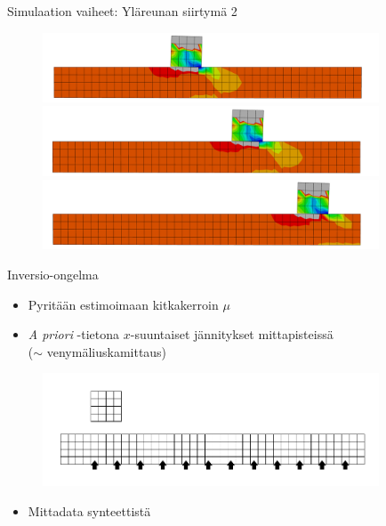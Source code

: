 \documentclass{beamer}
\begin{document}
\begin{frame}{Simulaation vaiheet: Yläreunan siirtymä 2}

\begin{figure}
\includegraphics[width=10cm]{anim3.pdf}\\
\includegraphics[width=10cm]{anim4.pdf}\\
\includegraphics[width=10cm]{anim5.pdf}
\end{figure}

\end{frame}

\begin{frame}{Inversio-ongelma}

\begin{itemize}
\item Pyritään estimoimaan kitkakerroin $\mu$
\item \emph{A priori} -tietona $x$-suuntaiset jännitykset mittapisteissä\\($\sim$ venymäliuskamittaus)
\end{itemize}

\begin{figure}
\includegraphics[width=10cm]{fretting_geom_meas.pdf}
\end{figure}

\begin{itemize}
\item Mittadata synteettistä
\end{itemize}

\end{frame}
\end{document}

